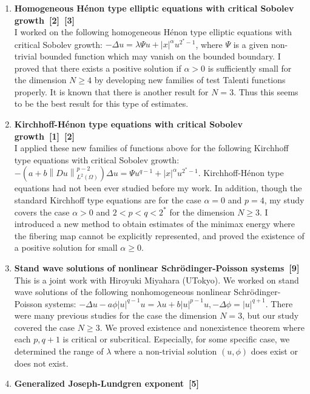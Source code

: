 \begin{enumerate}
  \item {\bf Homogeneous H\'enon type elliptic equations with critical Sobolev growth~[2]~[3]} \\
  I worked on the following
  homogeneous H\'enon type elliptic equations with critical Sobolev growth:
  $- \Delta u = \lambda \Psi u + \lvert x \rvert^\alpha u^{2^*-1}$,
  where
  $\Psi$ is a given non-trivial bounded function which may vanish on the bounded boundary. I proved that there exists a positive solution if $\alpha > 0$ is sufficiently small for the dimension $N \geq 4$ by developing new families of test Talenti functions properly. It is known that there is another result for $N = 3$. Thus this seems to be the best result for this type of estimates.
  \item {\bf Kirchhoff-H\'enon type equations with critical Sobolev growth~[1]~[2]} \\
  I applied these new families of functions above for the following Kirchhoff type equations with critical Sobolev growth:
  $- \left( a + b \left\| Du \right\|^{p-2}_{L^2(\Omega)} \right) \Delta u = \Psi u^{q-1} + \lvert x \rvert^\alpha u^{2^* - 1}$.
  Kirchhoff-H\'enon type equations had not been ever studied before my work. In addition, though the standard Kirchhoff type equations are for the case $\alpha = 0$ and $p = 4$, my study covers the case $\alpha > 0$ and $2 < p < q < 2^*$ for the dimension $N \geq 3$. I introduced a new method to obtain estimates of the minimax energy where the fibering map cannot be explicitly represented, and proved the existence of a positive solution for small $\alpha \geq 0$.
  \item {\bf Stand wave solutions of
  nonlinear Schr\"{o}dinger-Poisson systems~[9]} \\
  This is a joint work with Hiroyuki Miyahara (UTokyo).
  We worked on stand wave solutions
  of the following nonhomogeneous
  nonlinear Schr\"{o}dinger-Poisson systems:
  $-\Delta u -a \phi \left\lvert u \right\rvert^{q-1} u = \lambda u
  + b \left\lvert u \right\rvert^{p-1} u, -\Delta \phi =
  \left\lvert u \right\rvert^{q+1}$.
  There were many previous studies for the case the dimension $N = 3$,
  but our study covered the case $N \geq 3$.
  We proved existence and nonexistence theorem
  where each $p, q+1$ is critical or subcritical.
  Especially, for some specific case,
  we determined the range of $\lambda$ where a non-trivial solution
  $(u, \phi)$ does exist or does not exist.
  \item {\bf Generalized Joseph-Lundgren exponent~[5]} \\

\end{enumerate}
